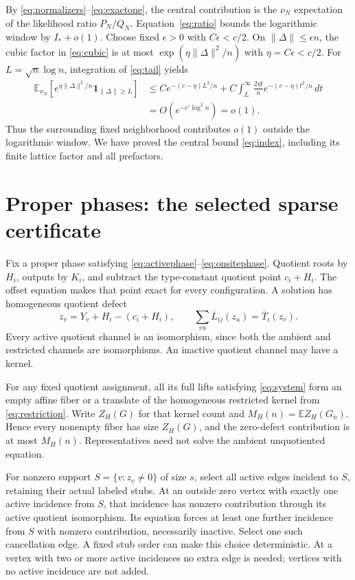 \documentclass[11pt]{article}
\newcommand{\E}{\mathbb E}
\newcommand{\one}{\mathbf 1}
\begin{document}
By \eqref{eq:normalizers}--\eqref{eq:exactone}, the central contribution is the $\nu_N$ expectation of the likelihood ratio $P_N/Q_N$. Equation~\eqref{eq:ratio} bounds the logarithmic window by $I_*+o(1)$. Choose fixed $\epsilon>0$ with $C\epsilon<c/2$. On $\|\Delta\|\le\epsilon n$, the cubic factor in \eqref{eq:cubic} is at most $\exp(\eta\|\Delta\|^2/n)$ with $\eta=C\epsilon<c/2$. For $L=\sqrt n\log n$, integration of \eqref{eq:tail} yields
\begin{align*}
 \E_{\nu_N}\left[e^{\eta\|\Delta\|^2/n}\one_{\|\Delta\|\ge L}\right]
 &\le Ce^{-(c-\eta)L^2/n}
 +C\int_L^\infty\frac{2\eta t}{n}e^{-(c-\eta)t^2/n}\,dt\\
 &=O(e^{-c'\log^2n})=o(1).
\end{align*}
Thus the surrounding fixed neighborhood contributes $o(1)$ outside the logarithmic window. We have proved the central bound \eqref{eq:index}, including its finite lattice factor and all prefactors.

\section{Proper phases: the selected sparse certificate}
Fix a proper phase satisfying \eqref{eq:activephase}--\eqref{eq:onsitephase}. Quotient roots by $H_i$, outputs by $K_i$, and subtract the type-constant quotient point $c_i+H_i$. The offset equation makes that point exact for every configuration. A solution has homogeneous quotient defect
\begin{equation}\label{eq:quotient}
 z_v=Y_v+H_i-(c_i+H_i),\qquad
 \sum_{vu}\overline L_{ij}(z_u)=\overline T_i(z_v).
\end{equation}
Every active quotient channel is an isomorphism, since both the ambient and restricted channels are isomorphisms. An inactive quotient channel may have a kernel.

For any fixed quotient assignment, all its full lifts satisfying \eqref{eq:system} form an empty affine fiber or a translate of the homogeneous restricted kernel from \eqref{eq:restriction}. Write $Z_H(G)$ for that kernel count and $M_H(n)=\E Z_H(G_n)$. Hence every nonempty fiber has size $Z_H(G)$, and the zero-defect contribution is at most $M_H(n)$. Representatives need not solve the ambient unquotiented equation.

For nonzero support $S=\{v:z_v\ne0\}$ of size $s$, select all active edges incident to $S$, retaining their actual labeled stubs. At an outside zero vertex with exactly one active incidence from $S$, that incidence has nonzero contribution through its active quotient isomorphism. Its equation forces at least one further incidence from $S$ with nonzero contribution, necessarily inactive. Select one such cancellation edge. A fixed stub order can make this choice deterministic. At a vertex with two or more active incidences no extra edge is needed; vertices with no active incidence are not added.
\end{document}

